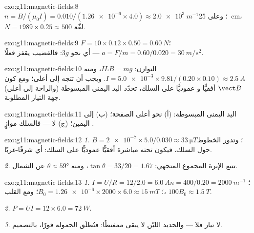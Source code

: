 \begin{solution}{exo:g11:magnetic-fields:8}
$n = B/(\mu_0 I) = 0.010 / (\num{1.26e-6} \times 4.0)
\approx \qty{2.0e3}{m^{-1}}$؛ وعلى \qty{25}{cm}،
$N = 1989 \times 0.25 \approx 500$ لفّة.
\end{solution}

\begin{solution}{exo:g11:magnetic-fields:9}
$F = 10 \times 0.12 \times 0.50 = \qty{0.60}{N}$؛
$a = F/m = 0.60/0.020 = \qty{30}{m/s^2}$ --- أي نحو $3g$: فالقضيب
يقفز فعلًا.
\end{solution}

\begin{solution}{exo:g11:magnetic-fields:10}
التوازن: $ILB = mg$، ومنه
$I = \num{5.0e-3} \times 9.81 / (0.20 \times 0.10) \approx
\qty{2.5}{A}$. ويجب أن تتجه  إلى أعلى؛ ومع كون $\vect B$ أفقيًّا و
عموديًّا على السلك، تحدّد اليد اليمنى المبسوطة (والراحة إلى أعلى)
جهة التيار المطلوبة.
\end{solution}

\begin{solution}{exo:g11:magnetic-fields:11}
اليد اليمنى المبسوطة: (أ) نحو أعلى الصفحة؛ (ب) إلى اليمين؛
(ج) لا  --- فالسلك موازٍ .
\end{solution}

\begin{solution}{exo:g11:magnetic-fields:12}
\emph{1.} $B = \num{2e-7} \times 5.0 / 0.030 \approx
\qty{33}{\micro T}$؛ وتدور الخطوط حول السلك، فيكون  تحته مباشرة
أفقيًّا عموديًّا على السلك: أي شرقًا-غربًا.

\emph{2.} تتبع الإبرة المجموع المتجهي: $\tan\theta = 33/20 =
1.67$، ومنه $\theta \approx \ang{59}$ عن الشمال.
\end{solution}

\begin{solution}{exo:g11:magnetic-fields:13}
\emph{1.} $I = U/R = 12/2.0 = \qty{6.0}{A}$؛
$n = 400/0.20 = \qty{2000}{m^{-1}}$؛
$B_0 = \num{1.26e-6} \times 2000 \times 6.0 \approx \qty{15}{mT}$؛
ومع القلب، $100 B_0 \approx \qty{1.5}{T}$.

\emph{2.} $P = UI = 12 \times 6.0 = \qty{72}{W}$.

\emph{3.} لا تيار فلا  --- والحديد الليّن لا يبقى
ممغنطًا: فتُطلَق الحمولة فورًا، بالتصميم.
\end{solution}

